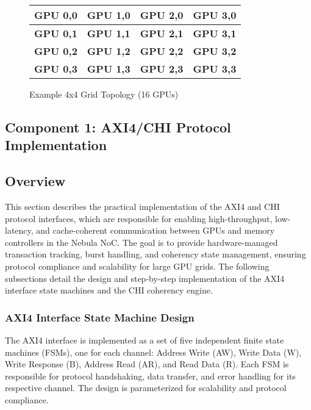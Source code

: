 \documentclass[11pt,a4paper]{article}
\begin{document}
\begin{figure}[H]
    \centering
    \begin{tabular}{|c|c|c|c|}
        \hline
        \textbf{GPU 0,0} & \textbf{GPU 1,0} & \textbf{GPU 2,0} & \textbf{GPU 3,0} \\
        \hline
        \textbf{GPU 0,1} & \textbf{GPU 1,1} & \textbf{GPU 2,1} & \textbf{GPU 3,1} \\
        \hline
        \textbf{GPU 0,2} & \textbf{GPU 1,2} & \textbf{GPU 2,2} & \textbf{GPU 3,2} \\
        \hline
        \textbf{GPU 0,3} & \textbf{GPU 1,3} & \textbf{GPU 2,3} & \textbf{GPU 3,3} \\
        \hline
    \end{tabular}
    \caption{Example 4x4 Grid Topology (16 GPUs)}
\end{figure}

\subsection{Component 1: AXI4/CHI Protocol Implementation}

\subsection*{Overview}
This section describes the practical implementation of the AXI4 and CHI protocol interfaces, which are responsible for enabling high-throughput, low-latency, and cache-coherent communication between GPUs and memory controllers in the Nebula NoC. The goal is to provide hardware-managed transaction tracking, burst handling, and coherency state management, ensuring protocol compliance and scalability for large GPU grids. The following subsections detail the design and step-by-step implementation of the AXI4 interface state machines and the CHI coherency engine.

\subsubsection{AXI4 Interface State Machine Design}

The AXI4 interface is implemented as a set of five independent finite state machines (FSMs), one for each channel: Address Write (AW), Write Data (W), Write Response (B), Address Read (AR), and Read Data (R). Each FSM is responsible for protocol handshaking, data transfer, and error handling for its respective channel. The design is parameterized for scalability and protocol compliance.
\end{document}
